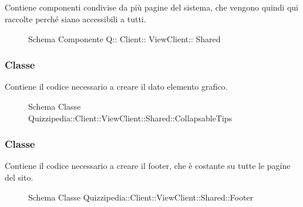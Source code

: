 \subsection{}
Contiene componenti condivise da più pagine del sistema, che vengono quindi qui raccolte perché siano accessibili a tutti.
\begin{figure}[H]
\centering
\noindent{}
\caption[Schema Componente Quizzipedia::Client::ViewClient::Shared]{Schema Componente Q:: Client:: ViewClient:: Shared}
\end{figure}
\subsubsection{Classe }
Contiene il codice necessario a creare il dato elemento grafico.
\begin{figure}[H]
\centering
\noindent{}
\caption[Schema Classe CollapsableTips]{Schema Classe Quizzipedia::Client::ViewClient::Shared::CollapsableTips}
\end{figure}
\subsubsection{Classe }
Contiene il codice necessario a creare il footer, che è costante su tutte le pagine del sito.
\begin{figure}[H]
\centering
\noindent{}
\caption[Schema Classe Footer]{Schema Classe Quizzipedia::Client::ViewClient::Shared::Footer}
\end{figure}
